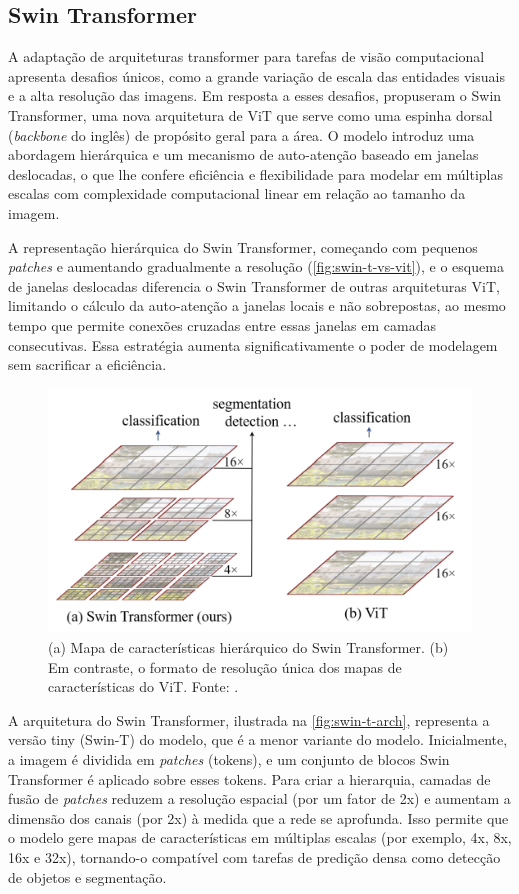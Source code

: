 \subsection{Swin Transformer}

A adaptação de arquiteturas transformer para tarefas de visão computacional apresenta desafios únicos, como a grande variação de escala das entidades visuais e a alta resolução das imagens. Em resposta a esses desafios, \cite{Liu2021} propuseram o Swin Transformer, uma nova arquitetura de ViT que serve como uma espinha dorsal (\textit{backbone} do inglês) de propósito geral para a área. O modelo introduz uma abordagem hierárquica e um mecanismo de auto-atenção baseado em janelas deslocadas, o que lhe confere eficiência e flexibilidade para modelar em múltiplas escalas com complexidade computacional linear em relação ao tamanho da imagem.

A representação hierárquica do Swin Transformer, começando com pequenos \textit{patches} e aumentando gradualmente a resolução (\autoref{fig:swin-t-vs-vit}), e o esquema de janelas deslocadas diferencia o Swin Transformer de outras arquiteturas ViT, limitando o cálculo da auto-atenção a janelas locais e não sobrepostas, ao mesmo tempo que permite conexões cruzadas entre essas janelas em camadas consecutivas. Essa estratégia aumenta significativamente o poder de modelagem sem sacrificar a eficiência.

\begin{figure}[h]
    \centering
    \includegraphics[width=0.7\linewidth]{figs/swin_t_vs_vit.png}
    \caption{(a) Mapa de características hierárquico do Swin Transformer. (b) Em contraste, o formato de resolução única dos mapas de características do ViT. Fonte: \cite{Liu2021}.}
    \label{fig:swin-t-vs-vit}
\end{figure}

A arquitetura do Swin Transformer, ilustrada na \autoref{fig:swin-t-arch}, representa a versão tiny (Swin-T) do modelo, que é a menor variante do modelo. Inicialmente, a imagem é dividida em \textit{patches} (tokens), e um conjunto de blocos Swin Transformer é aplicado sobre esses tokens. Para criar a hierarquia, camadas de fusão de \textit{patches} reduzem a resolução espacial (por um fator de 2x) e aumentam a dimensão dos canais (por 2x) à medida que a rede se aprofunda. Isso permite que o modelo gere mapas de características em múltiplas escalas (por exemplo, 4x, 8x, 16x e 32x), tornando-o compatível com tarefas de predição densa como detecção de objetos e segmentação.

